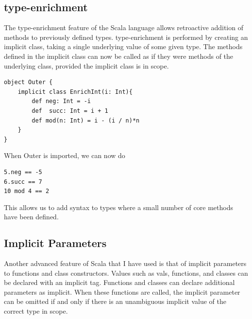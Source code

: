 \documentclass[12pt,a4paper,twoside,openright]{report}
\renewcommand{\baselinestretch}{1.1}    %
\begin{document}
\subsection{type-enrichment}
The type-enrichment feature of the Scala language allows retroactive addition of methods to previously defined types. type-enrichment is performed by creating an implicit class, taking a single underlying value of some given type. The methods defined in the implicit class can now be called as if they were methods of the underlying class, provided the implicit class is in scope.

\renewcommand{\baselinestretch}{0.8}
\begin{framed}
\begin{framed}
\begin{verbatim}
object Outer {
    implicit class EnrichInt(i: Int){
        def neg: Int = -i
        def  succ: Int = i + 1
        def mod(n: Int) = i - (i / n)*n
    }
}
\end{verbatim}
\end{framed}
\renewcommand{\baselinestretch}{1.1}
When Outer is imported, we can now do

\renewcommand{\baselinestretch}{0.8}
\begin{framed}
\begin{verbatim}
5.neg == -5
6.succ == 7
10 mod 4 == 2
\end{verbatim}
\end{framed}
\end{framed}
\renewcommand{\baselinestretch}{1.1}






This allows us to add syntax to types where a small number of core methods have been defined.

\subsection{Implicit Parameters}
Another advanced feature of Scala that  I have used is that of implicit  parameters to functions and class constructors. Values such as vals, functions, and classes can be declared with an implicit tag. Functions and classes can declare additional parameters as implicit. When these functions are called, the implicit parameter can be omitted if and only if there is an unambiguous implicit value of the correct type in scope.
\end{document}

